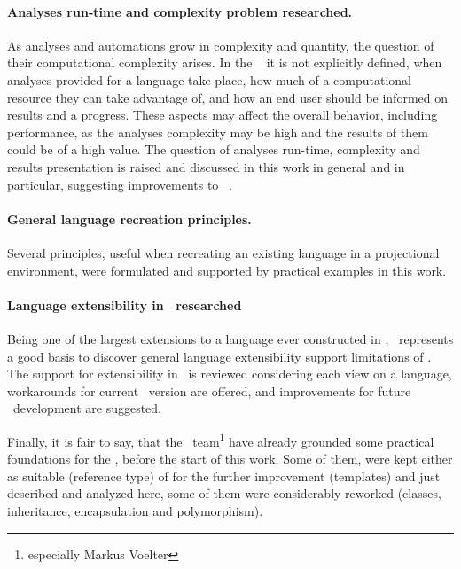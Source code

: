  \paragraph{Analyses run-time and complexity problem researched.} As analyses and automations grow in complexity and quantity, the question of their computational complexity arises.
In the \jbmps\  it is not explicitly defined, when analyses provided for a language take place, 
how much of a computational resource they can take advantage of, and how an end user should be informed on results and a progress. 
These aspects may affect the overall  behavior, including performance, as the analyses complexity may be high and the results of them could 
be of a high value. The question of analyses run-time, complexity and results presentation is raised and discussed in 
this work in general and in particular, suggesting improvements to \jbmps\ .

 \paragraph{General language recreation principles.} Several principles, useful when recreating an existing language in a projectional 
 environment, were formulated and supported by practical examples in this work.
 
 \paragraph{Language extensibility in \jbmps\ researched} Being one of the largest extensions to a language ever constructed in \jbmps, \pcpp\ 
 represents a good basis to discover general language extensibility support limitations of \jbmps. The support for extensibility in \jbmps\ is 
 reviewed considering each view on a language, workarounds for current \jbmps\ version are offered, and improvements for future \jbmps\ development
 are suggested.
 
 \vspace{10 mm}
 
Finally, it is fair to say, that the \mbdr\ team\footnote{especially Markus Voelter} have already grounded some practical foundations for the \pcpp, 
before the start of this work. Some of them, were kept either as suitable (reference type) of for the further improvement (templates) and just described and analyzed 
here, some of them were considerably reworked (classes, inheritance, encapsulation and polymorphism). 

